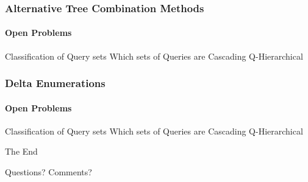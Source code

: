 \documentclass[
	11pt, %
]{beamer}
\begin{document}
\begin{frame}
	\frametitle{Alternative Tree Combination Methods}
	\framesubtitle{Open Problems}
	\begin{block}{Classification of Query sets}
		Which sets of Queries are Cascading Q-Hierarchical
	\end{block}
\end{frame}

\begin{frame}
	\frametitle{Delta Enumerations}
	\framesubtitle{Open Problems}
	\begin{block}{Classification of Query sets}
		Which sets of Queries are Cascading Q-Hierarchical
	\end{block}
\end{frame}

\begin{frame}[plain] %
	\begin{center}
		{\Huge The End}
		
		\bigskip\bigskip %
		
		{\LARGE Questions? Comments?}
	\end{center}
\end{frame}

\end{document}
